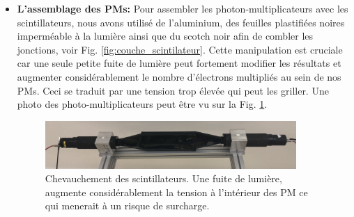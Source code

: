 \documentclass[12pt]{article}
\begin{document}
\begin{itemize}
    \item \textbf{L'assemblage des PMs: } Pour assembler les photon-multiplicateurs avec les scintillateurs, nous avons utilisé de l'aluminium, des feuilles plastifiées noires imperméable à la lumière ainsi que du scotch noir afin de combler les jonctions, voir Fig. \ref{fig:couche_scintilateur}. Cette manipulation est cruciale car une seule petite fuite de lumière peut fortement modifier les résultats et augmenter considérablement le nombre d'électrons multipliés au sein de nos PMs. Ceci se traduit par une tension trop élevée qui peut les griller. Une photo des photo-multiplicateurs peut être vu sur la Fig. \ref{fig:PMS_photo}.
    
    \begin{figure}[htpb!]
        \centering
        \includegraphics[width=0.9\textwidth]{Images/Photos/PM_photo.jpg}
        \caption{Chevauchement des scintillateurs. Une fuite de lumière, augmente considérablement la tension à l'intérieur des PM ce qui menerait à un risque de surcharge.}
        \label{fig:PMS_photo}
    \end{figure}


\end{itemize}
\end{document}
